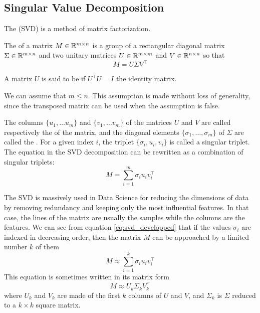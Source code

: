 \subsection{Singular Value Decomposition}
The  (SVD) is a method of matrix factorization.
\begin{definition}
    The  of a matrix $M \in \mathbb{R}^{m\times n}$ is a group of a rectangular diagonal matrix $\Sigma \in \mathbb{R}^{m \times n}$ and two unitary matrices $U \in \mathbb{R}^{m\times m}$ and $V \in \mathbb{R}^{n\times n}$ so that
    \begin{equation}
        M = U\Sigma V^\top
    \end{equation}
\end{definition}
A matrix $U$ is said to be  if $U^\top U = I$ the identity matrix.

We can assume that $m \leq n$. This assumption is made without loss of generality, since the transposed matrix can be used when the assumption is false.

The columns $\{u_1,\dots u_m\}$ and $\{v_1, \dots v_m\}$ of the matrices $U$ and $V$ are called respectively the  of the matrix, and the diagonal elements $\{\sigma_1, \dots, \sigma_m\}$ of $\Sigma$ are called the . For a given index $i$, the triplet $\{\sigma_i, u_i, v_i\}$ is called a singular triplet. The equation in the SVD decomposition can be rewritten as a combination of singular triplets:
\begin{equation}\label{eq:svd_developped}
    M = \sum_{i=1}^m \sigma_i u_i v_i^\top
\end{equation}

The SVD is massively used in Data Science for reducing the dimensions of data by removing redundancy and keeping only the most influential features. In that case, the lines of the matrix are usually the samples while the columns are the features. We can see from equation \ref{eq:svd_developped} that if the values $\sigma_i$ are indexed in decreasing order, then the matrix $M$ can be approached by a limited number $k$ of them
\begin{equation}\label{eq:svd_trunc_developped}
    M \approx \sum_{i=1}^k \sigma_i u_i v_i^\top
\end{equation}
This equation is sometimes written in its matrix form
\begin{equation}
    M \approx U_k\Sigma_k V_k^\top
\end{equation}
where $U_k$ and $V_k$ are made of the first $k$ columns of $U$ and $V$, and $\Sigma_k$ is $\Sigma$ reduced to a $k\times k$ square matrix.


